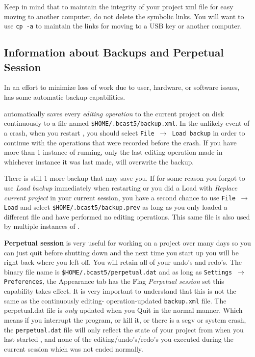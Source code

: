 \noindent Keep in mind that to maintain the integrity of your project xml file for easy moving to another computer, do not delete the symbolic links.  You will want to use \texttt{cp\,-a} to maintain the links for moving to a USB key or another computer.

\subsection{Information about Backups and Perpetual Session}%
\label{sub:information_backups_perpetual_session}

In an effort to minimize loss of work due to user, hardware, or software issues, \CGG{} has some automatic backup capabilities.

\CGG{} automatically saves every \textit{editing operation} to the current project on disk continuously to a file named \texttt{\$HOME/.bcast5/backup.xml}.  In the unlikely event of a crash, when you restart \CGG{}, you should select \texttt{File $\rightarrow$ Load backup} in order to continue with the operations that were recorded before the crash.  If you have more than 1 instance of \CGG{} running, only the last editing operation made in whichever instance it was last made, will overwrite the backup. 

There is still 1 more backup that may save you.  If for some reason you forgot to use \textit{Load backup}
immediately when restarting or you did a Load with \textit{Replace current project} in your current session,
you have a second chance to use \texttt{File $\rightarrow$ Load} and select \texttt{\$HOME/.bcast5/backup.prev}
as long as you only loaded a different file and have performed no editing operations.  This same file is also used by multiple instances of \CGG{}.

\textbf{Perpetual session} is very useful for working on a project over many days so you can just quit before shutting down and the next time you start up \CGG{} you will be right back where you left off.  
You will retain all of your undo’s and redo’s.  
The binary file name is \texttt{\$HOME/.bcast5/perpetual.dat} and as long as \texttt{Settings $\rightarrow$ Preferences}, the Appearance tab has the Flag \textit{Perpetual session} set this capability takes effect.  
It is very important to understand that this is not the same as the continuously editing- operation-updated \texttt{backup.xml} file.  
The perpetual.dat file is \textit{only} updated when you Quit \CGG{} in the normal manner.  
Which means if you interrupt the program, or kill it, or there is a segv or system crash, the \texttt{perpetual.dat} file will only reflect the state of your project from when you last started \CGG{}, and none of the editing/undo’s/redo’s you executed during the current session which was not ended normally.
\vspace{1ex}

